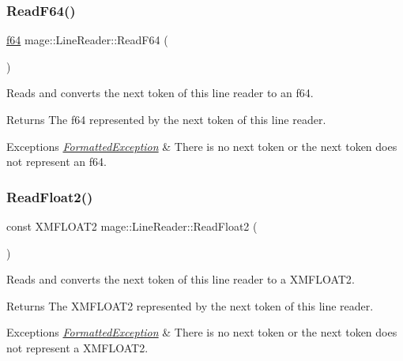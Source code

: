 \subsubsection{\texorpdfstring{Read\+F64()}{ReadF64()}}
{\footnotesize\ttfamily \hyperlink{namespacemage_ab935747c6941320bd6214b5a5f265b09}{f64} mage\+::\+Line\+Reader\+::\+Read\+F64 (\begin{DoxyParamCaption}{ }\end{DoxyParamCaption})\hspace{0.3cm}{\ttfamily [protected]}}

Reads and converts the next token of this line reader to an {\ttfamily f64}.

\begin{DoxyReturn}{Returns}
The {\ttfamily f64} represented by the next token of this line reader. 
\end{DoxyReturn}

\begin{DoxyExceptions}{Exceptions}
{\em \hyperlink{structmage_1_1_formatted_exception}{Formatted\+Exception}} & There is no next token or the next token does not represent an {\ttfamily f64}. \\
\hline
\end{DoxyExceptions}
\hypertarget{classmage_1_1_line_reader_ae33effd33fad465616e3acf8acdc408f}{}\label{classmage_1_1_line_reader_ae33effd33fad465616e3acf8acdc408f} 
\subsubsection{\texorpdfstring{Read\+Float2()}{ReadFloat2()}}
{\footnotesize\ttfamily const X\+M\+F\+L\+O\+A\+T2 mage\+::\+Line\+Reader\+::\+Read\+Float2 (\begin{DoxyParamCaption}{ }\end{DoxyParamCaption})\hspace{0.3cm}{\ttfamily [protected]}}

Reads and converts the next token of this line reader to a {\ttfamily X\+M\+F\+L\+O\+A\+T2}.

\begin{DoxyReturn}{Returns}
The {\ttfamily X\+M\+F\+L\+O\+A\+T2} represented by the next token of this line reader. 
\end{DoxyReturn}

\begin{DoxyExceptions}{Exceptions}
{\em \hyperlink{structmage_1_1_formatted_exception}{Formatted\+Exception}} & There is no next token or the next token does not represent a {\ttfamily X\+M\+F\+L\+O\+A\+T2}. \\
\hline
\end{DoxyExceptions}
\hypertarget{classmage_1_1_line_reader_a7a605a7c2402051f1ca4fda1e543fc28}{}\label{classmage_1_1_line_reader_a7a605a7c2402051f1ca4fda1e543fc28} 
